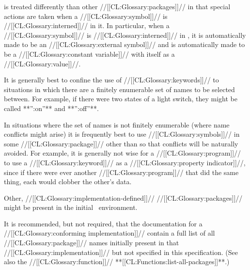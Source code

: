  is treated differently than other //[[CL:Glossary:packages]]//
in that special actions are taken when a //[[CL:Glossary:symbol]]// is //[[CL:Glossary:interned]]// in it.
In particular, when a //[[CL:Glossary:symbol]]// is //[[CL:Glossary:interned]]// in ,
 it is automatically made to be an //[[CL:Glossary:external symbol]]// 
and is automatically made to be a //[[CL:Glossary:constant variable]]// with itself as a //[[CL:Glossary:value]]//.





\endsubsubsubsection%







It is generally best to confine the use of //[[CL:Glossary:keywords]]// to situations in which
there are a finitely enumerable set of names to be selected between.  For example,
if there were two states of a light switch, they might be called **'':on''** and **'':off''**.

In situations where the set of names is not finitely enumerable
(\ie where name conflicts might arise)
it is frequently best to use //[[CL:Glossary:symbols]]// in some //[[CL:Glossary:package]]//
other than  so that conflicts will be naturally avoided.
For example, it is generally not wise for a //[[CL:Glossary:program]]// to use a //[[CL:Glossary:keyword]]// 
as a //[[CL:Glossary:property indicator]]//, since if there were ever another //[[CL:Glossary:program]]//
that did the same thing, each would clobber the other's data.

\endsubsubsubsection%

\endsubsubsection%


Other, //[[CL:Glossary:implementation-defined]]// //[[CL:Glossary:packages]]// might be present
in the initial \clisp\ environment.





It is recommended, but not required, that the documentation for a
//[[CL:Glossary:conforming implementation]]// contain a full list of all //[[CL:Glossary:package]]// names
initially present in that //[[CL:Glossary:implementation]]// but not specified in this specification.
(See also the //[[CL:Glossary:function]]// **[[CL:Functions:list-all-packages]]**.)

\endsubsubsection%

\endsubSection%

